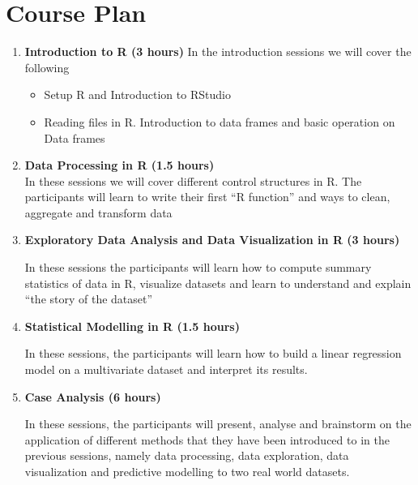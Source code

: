 \documentclass[15pt]{book}\usepackage[]{graphicx}\usepackage[]{color}
\begin{document}
  \section*{Course Plan}
  \begin{enumerate} 
    \item \textbf{Introduction to R (3 hours)}
\noindent In the introduction sessions we will cover the following
    \begin{itemize}
      \item Setup R and Introduction to RStudio 
      \item Reading files in R. Introduction to data frames and basic operation on Data frames 
    \end{itemize}
    
    \item \textbf{Data Processing in R (1.5 hours)} \\
    
\noindnet In these sessions we will cover different control structures in R. The participants will learn to write their first ``R function'' and ways to clean, aggregate and transform data \\
    \item \textbf{Exploratory Data Analysis and Data Visualization in R (3 hours)}
    
\noindent In these sessions the participants will learn how to compute summary statistics of data in R, visualize datasets and learn to understand and explain ``the story of the dataset'' \\
    \item \textbf{Statistical Modelling in R (1.5 hours)}
    
\noindent In these sessions, the participants will learn how to build a linear regression model on a multivariate dataset and interpret its results.\\
    \item \textbf{Case Analysis (6 hours)}
    
\noindent In these sessions, the participants will present, analyse and brainstorm on the application of different methods that they have been introduced to in the previous sessions, namely data processing, data exploration, data visualization and predictive modelling to two real world datasets.\\
  \end{enumerate}

\cleardoublepage
\end{document}
